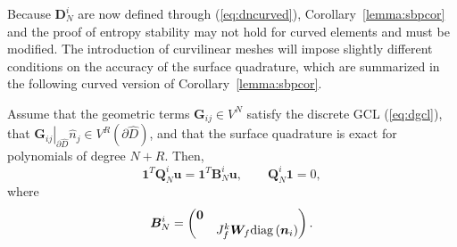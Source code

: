 \documentclass[review]{siamart0216}
\theoremstyle{assumption}
\renewcommand{\hat}[1]{\hat{#1}}
\newcommand{\LRp}[1]{\left( #1 \right)}
\newcommand{\LRl}[1]{\left. #1 \right|}
\renewcommand{\hat}{\widehat}
\newcommand{\diag}[1]{{\rm diag}\LRp{#1}}
\begin{document}
Because $\bm{D}^i_N$ are now defined through (\ref{eq:dncurved}), Corollary~\ref{lemma:sbpcor} and the proof of entropy stability may not hold for curved elements and must be modified.  The introduction of curvilinear meshes will impose slightly different conditions on the accuracy of the surface quadrature, which are summarized in the following curved version of Corollary~\ref{lemma:sbpcor}.
\begin{lemma}
Assume that the geometric terms $\bm{G}_{ij} \in V^N$ satisfy the discrete GCL (\ref{eq:dgcl}), that $\LRl{\bm{G}_{ij}}_{\partial \hat{D}}\hat{n}_j \in V^R\LRp{\partial \hat{D}}$, and that the surface quadrature is exact for polynomials of degree $N+R$.  Then, 
\[
\bm{1}^T\bm{Q}^i_N\bm{u} = \bm{1}^T\bm{B}^i_N \bm{u}, %
\qquad \bm{Q}^i_N \bm{1} = 0, 
\]
where 
\[
\bm{B}^i_N =  \begin{pmatrix}
\bm{0}&\\
& {J^k_f}\bm{W}_f \diag{{\bm{n}_i}}
\end{pmatrix}.
\]
\label{lemma:vdsbpcurved}
\end{lemma}
\end{document}
